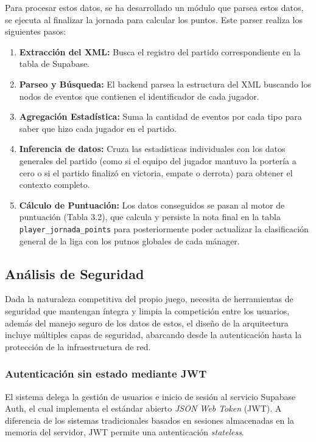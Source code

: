 Para procesar estos datos, se ha desarrollado un módulo que parsea estos datos, se ejecuta al finalizar la jornada para calcular los puntos. Este parser realiza los siguientes pasos:
\begin{enumerate}
    \item \textbf{Extracción del XML:} Busca el registro del partido correspondiente en la tabla de Supabase.
    \item \textbf{Parseo y Búsqueda:} El backend parsea la estructura del XML buscando los nodos de eventos que contienen el identificador de cada jugador.
    \item \textbf{Agregación Estadística:} Suma la cantidad de eventos por cada tipo para saber que hizo cada jugador en el partido.
    \item \textbf{Inferencia de datos:} Cruza las estadísticas individuales con los datos generales del partido (como si el equipo del jugador mantuvo la portería a cero o si el partido finalizó en victoria, empate o derrota) para obtener el contexto completo.
    \item \textbf{Cálculo de Puntuación:} Los datos conseguidos se pasan al motor de puntuación (Tabla 3.2), que calcula y persiste la nota final en la tabla \texttt{player\_jornada\_points} para posteriormente poder actualizar la clasificación general de la liga con los putnos globales de cada mánager.
\end{enumerate}

\subsection{Análisis de Seguridad}
Dada la naturaleza competitiva del propio juego, necesita de herramientas de seguridad que mantengan íntegra y limpia la competición entre los usuarios, además del manejo seguro de los datos de estos, el diseño de la arquitectura incluye múltiples capas de seguridad, abarcando desde la autenticación hasta la protección de la infraestructura de red.

\subsubsection{Autenticación sin estado mediante JWT}
El sistema delega la gestión de usuarios e inicio de sesión al servicio Supabase Auth, el cual implementa el estándar abierto \textit{JSON Web Token} (JWT). A diferencia de los sistemas tradicionales basados en sesiones almacenadas en la memoria del servidor, JWT permite una autenticación \textit{stateless}. 

